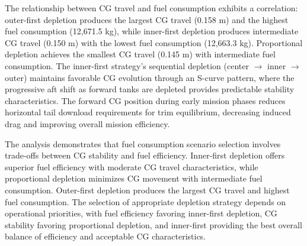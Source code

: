 The relationship between CG travel and fuel consumption exhibits a correlation: outer-first depletion produces the largest CG travel (0.158 m) and the highest fuel consumption (12,671.5 kg), while inner-first depletion produces intermediate CG travel (0.150 m) with the lowest fuel consumption (12,663.3 kg). Proportional depletion achieves the smallest CG travel (0.145 m) with intermediate fuel consumption. The inner-first strategy's sequential depletion (center $\rightarrow$ inner $\rightarrow$ outer) maintains favorable CG evolution through an S-curve pattern, where the progressive aft shift as forward tanks are depleted provides predictable stability characteristics. The forward CG position during early mission phases reduces horizontal tail download requirements for trim equilibrium, decreasing induced drag and improving overall mission efficiency.

The analysis demonstrates that fuel consumption scenario selection involves trade-offs between CG stability and fuel efficiency. Inner-first depletion offers superior fuel efficiency with moderate CG travel characteristics, while proportional depletion minimizes CG movement with intermediate fuel consumption. Outer-first depletion produces the largest CG travel and highest fuel consumption. The selection of appropriate depletion strategy depends on operational priorities, with fuel efficiency favoring inner-first depletion, CG stability favoring proportional depletion, and inner-first providing the best overall balance of efficiency and acceptable CG characteristics.



